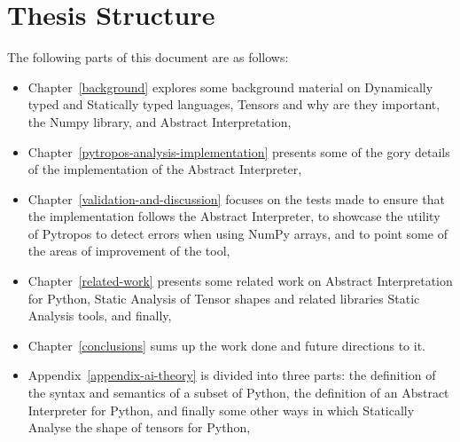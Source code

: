 \section{Thesis Structure}\label{thesis-structure}

The following parts of this document are as follows:

\begin{itemize}
\tightlist
\item
  Chapter~\ref{background} explores some background material on
  Dynamically typed and Statically typed languages, Tensors and why are
  they important, the Numpy library, and Abstract Interpretation,
\item
  Chapter~\ref{pytropos-analysis-implementation} presents some of the
  gory details of the implementation of the Abstract Interpreter,
\item
  Chapter~\ref{validation-and-discussion} focuses on the tests made to
  ensure that the implementation follows the Abstract Interpreter, to
  showcase the utility of Pytropos to detect errors when using NumPy
  arrays, and to point some of the areas of improvement of the tool,
\item
  Chapter~\ref{related-work} presents some related work on Abstract
  Interpretation for Python, Static Analysis of Tensor shapes and
  related libraries Static Analysis tools, and finally,
\item
  Chapter~\ref{conclusions} sums up the work done and future directions
  to it.
\item
  Appendix~\ref{appendix-ai-theory}
  is divided into three parts: the definition of the syntax and
  semantics of a subset of Python, the definition of an Abstract
  Interpreter for Python, and finally some other ways in which
  Statically Analyse the shape of tensors for Python,
\end{itemize}
